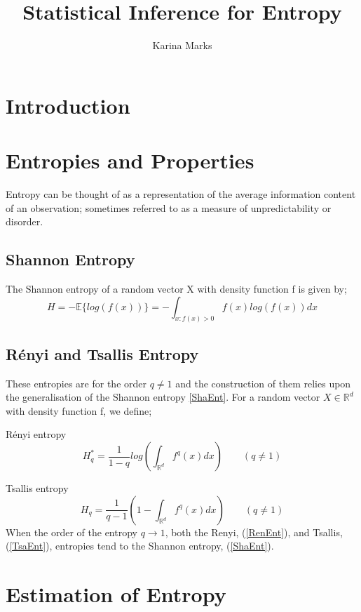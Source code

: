 \documentclass{article}
\title{Statistical Inference for Entropy}
\author{Karina Marks}
\begin{document}
\maketitle
\section{Introduction}



\section{Entropies and Properties}

Entropy can be thought of as a representation of the average information content of an observation; sometimes referred to as a measure of unpredictability or disorder. 

\subsection{Shannon Entropy}
The Shannon entropy of a random vector X with density function f is given by;
\begin{equation} \label{ShaEnt}
H = - \mathbb{E} \{log(f(x))\} = - \int_{x : f(x) > 0} f(x) log(f(x)) dx
\end{equation}

\subsection{ R\'enyi and Tsallis Entropy}
These entropies are for the order $q \neq 1$ and the construction of them relies upon the generalisation of the Shannon entropy \ref{ShaEnt}. For a random vector $X \in \mathbb{R}^d$ with density function f, we define;

R\'enyi entropy
\begin{equation} \label{RenEnt}
H_{q}^{*} = \frac{1}{1-q} log \left( \int_{\mathbb{R}^d} f^q (x) dx \right) \quad  \quad (q \neq 1)
\end{equation}

Tsallis entropy
\begin{equation} \label{TsaEnt}
H_{q} = \frac{1}{q-1} \left(1 - \int_{\mathbb{R}^d} f^q (x) dx \right)  \quad  \quad (q \neq 1)
\end{equation}
When the order of the entropy $q \to 1$, both the Renyi, (\ref{RenEnt}), and Tsallis, (\ref{TsaEnt}), entropies tend to the Shannon entropy, (\ref{ShaEnt}). 

\section{Estimation of Entropy}
\end{document}
